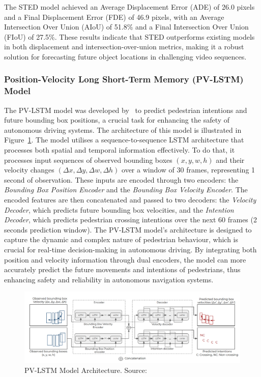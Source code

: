 \documentclass[12pt,oneside]{book} %
\begin{document}
\noindent The STED model achieved an Average Displacement Error (ADE) of 26.0 pixels and
a Final Displacement Error (FDE) of 46.9 pixels, with an Average Intersection
Over Union (AIoU) of 51.8\% and a Final Intersection Over Union (FIoU) of
27.5\%. These results indicate that STED outperforms existing models in both
displacement and intersection-over-union metrics, making it a robust solution
for forecasting future object locations in challenging video sequences.

\subsubsection*{Position-Velocity Long Short-Term Memory (PV-LSTM) Model}

The PV-LSTM model was developed by~\citet{DBLP:journals/corr/abs-2010-10270} to
predict pedestrian intentions and future bounding box positions, a crucial task
for enhancing the safety of autonomous driving systems. The architecture of
this model is illustrated in Figure~\ref{fig:pv-lstm}. The model utilises a
sequence-to-sequence LSTM architecture that processes both spatial and temporal
information effectively. To do that, it processes input sequences of observed
bounding boxes $(x, y, w, h)$ and their velocity changes $(\Delta x, \Delta y,
    \Delta w, \Delta h)$ over a window of 30 frames, representing 1 second of
observation. These inputs are encoded through two encoders: the
\textit{Bounding Box Position Encoder} and the \textit{Bounding Box Velocity
    Encoder}. The encoded features are then concatenated and passed to two
decoders: the \textit{Velocity Decoder}, which predicts future bounding box
velocities, and the \textit{Intention Decoder}, which predicts pedestrian
crossing intentions over the next 60 frames (2 seconds prediction window). The
PV-LSTM model’s architecture is designed to capture the dynamic and complex
nature of pedestrian behaviour, which is crucial for real-time decision-making
in autonomous driving. By integrating both position and velocity information
through dual encoders, the model can more accurately predict the future
movements and intentions of pedestrians, thus enhancing safety and reliability
in autonomous navigation systems.

\begin{figure}[H]
    \centering
    \includegraphics[width=1\textwidth]{figures/PV-LSTM.png}
    \caption{PV-LSTM Model Architecture. Source:~\citet{DBLP:journals/corr/abs-2010-10270}}\label{fig:pv-lstm}
\end{figure}
\end{document}
